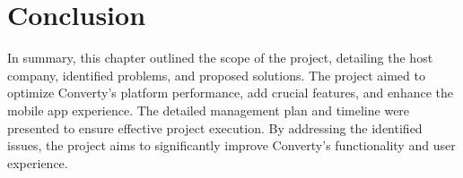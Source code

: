 \section{Conclusion}
In summary, this chapter outlined the scope of the project, detailing the host company, identified problems, and proposed solutions. The project aimed to optimize Converty's platform performance, add crucial features, and enhance the mobile app experience. The detailed management plan and timeline were presented to ensure effective project execution. By addressing the identified issues, the project aims to significantly improve Converty's functionality and user experience.
